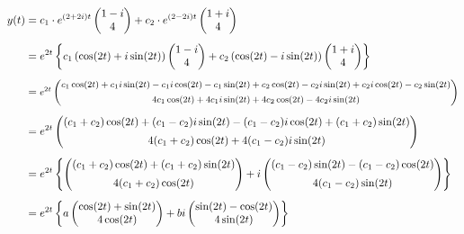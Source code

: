 \begin{equation*}
    \begin{aligned}
        y(t) &= c_1 \cdot e^{(2+2i)t} \begin{pmatrix}
            1-i \\ 4
        \end{pmatrix} + c_2  \cdot e^{(2-2i)t} \begin{pmatrix}
            1+i \\ 4
        \end{pmatrix} \\[0.5em] 
        &= e^{2t} \left\{
            c_1 \left( 
                \cos(2t) + i \sin(2t) \right) \begin{pmatrix}
                    1-i \\ 4
                \end{pmatrix} + c_2  \left( 
                \cos(2t) - i \sin(2t) \right) \begin{pmatrix}
                    1+i \\ 4
                \end{pmatrix}
        \right\} \\[0.5em]
        &= \text{\footnotesize $e^{2t} \begin{pmatrix}
            c_1 \cos(2t) + c_1 i \sin(2t) - c_1 i \cos(2t) - c_1 \sin(2t) + c_2  \cos(2t) - c_2  i \sin(2t) + c_2  i \cos(2t) - c_2  \sin(2t) \\[0.5em]
            4 c_1 \cos(2t) + 4 c_1 i \sin(2t) + 4 c_2  \cos(2t) - 4 c_2  i \sin(2t)
        \end{pmatrix}$} \\[0.5em]
        &= e^{2t} \begin{pmatrix}
            ( c_1 + c_2  ) \cos(2t) + ( c_1 - c_2  ) i \sin(2t) - ( c_1 - c_2  ) i \cos(2t) + ( c_1 + c_2  ) \sin(2t) \\[0.5em]
            4 ( c_1 + c_2  ) \cos(2t) + 4 ( c_1 - c_2  ) i \sin(2t)
        \end{pmatrix} \\[0.5em]
        &= e^{2t} \left\{ \begin{pmatrix}
            ( c_1 + c_2  ) \cos(2t) + ( c_1 + c_2  ) \sin(2t) \\[0.5em]
            4 ( c_1 + c_2  ) \cos(2t)
        \end{pmatrix} + i \begin{pmatrix}
            ( c_1 - c_2  ) \sin(2t) - ( c_1 - c_2  ) \cos(2t) \\[0.5em]
            4 ( c_1 - c_2  ) \sin(2t)
        \end{pmatrix} \right\} \\[0.5em]
        &= e^{2t} \left\{ a \begin{pmatrix}
            \cos(2t) + \sin(2t) \\
            4 \cos(2t)
        \end{pmatrix} + b i \begin{pmatrix}
            \sin(2t) - \cos(2t) \\
            4 \sin(2t)
        \end{pmatrix} \right\} 
    \end{aligned}
\end{equation*}

